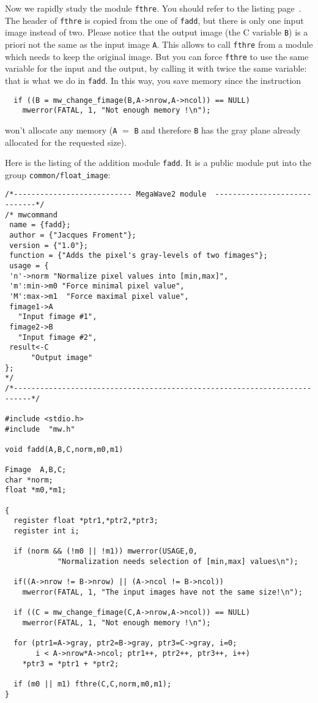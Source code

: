 Now we rapidly study the module \verb+fthre+.
You should refer to the listing page~\pageref{listing_fthre}.
The header of \verb+fthre+ is copied from the one of \verb+fadd+, but there is
only one input image instead of two.
Please notice that the output image (the C variable \verb+B+) is a priori not the same
as the input image \verb+A+.
This allows to call \verb+fthre+ from a module which needs to keep the original image.
But you can force \verb+fthre+ to use the same variable for the input and the output,
by calling it with twice the same variable: that is what we do in \verb+fadd+.
In this way, you save memory since the instruction
\begin{verbatim}
  if ((B = mw_change_fimage(B,A->nrow,A->ncol)) == NULL)
    mwerror(FATAL, 1, "Not enough memory !\n");  
\end{verbatim}
won't allocate any memory (\verb+A+ $=$ \verb+B+ and therefore \verb+B+ has the gray
plane already allocated for the requested size).

Here is the listing of the addition module \verb+fadd+.
It is a public module put into the group \verb+common/float_image+:
{\small
\label{listing_fadd}
\begin{verbatim}
/*--------------------------- MegaWave2 module  -----------------------------*/
/* mwcommand
 name = {fadd};
 author = {"Jacques Froment"};
 version = {"1.0"};
 function = {"Adds the pixel's gray-levels of two fimages"};
 usage = {
 'n'->norm "Normalize pixel values into [min,max]",
 'm':min->m0 "Force minimal pixel value",
 'M':max->m1  "Force maximal pixel value",
 fimage1->A 
   "Input fimage #1", 
 fimage2->B
   "Input fimage #2", 
 result<-C
      "Output image"
};
*/
/*--------------------------------------------------------------------------*/

#include <stdio.h>
#include  "mw.h"

void fadd(A,B,C,norm,m0,m1)

Fimage  A,B,C;
char *norm;
float *m0,*m1;

{
  register float *ptr1,*ptr2,*ptr3;
  register int i;

  if (norm && (!m0 || !m1)) mwerror(USAGE,0,
            "Normalization needs selection of [min,max] values\n");

  if((A->nrow != B->nrow) || (A->ncol != B->ncol))
    mwerror(FATAL, 1, "The input images have not the same size!\n");

  if ((C = mw_change_fimage(C,A->nrow,A->ncol)) == NULL)
    mwerror(FATAL, 1, "Not enough memory !\n");  

  for (ptr1=A->gray, ptr2=B->gray, ptr3=C->gray, i=0;
       i < A->nrow*A->ncol; ptr1++, ptr2++, ptr3++, i++)
    *ptr3 = *ptr1 + *ptr2;

  if (m0 || m1) fthre(C,C,norm,m0,m1);
}

\end{verbatim}
}

